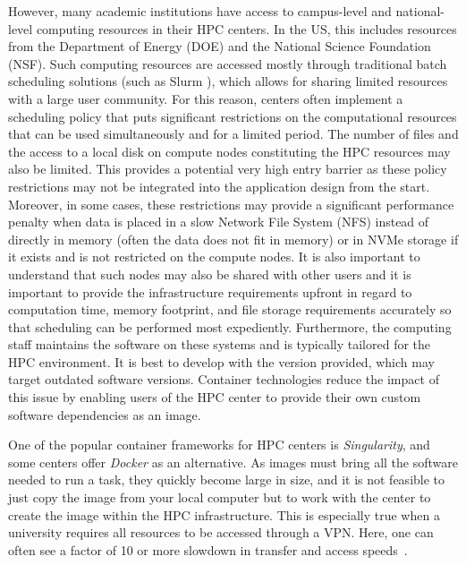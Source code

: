 \documentclass[utf8]{FrontiersinVancouver} %
\begin{document}
However, many academic institutions have access to campus-level and national-level computing resources in their HPC centers. In the US, this includes resources from the Department of Energy (DOE) and the National Science Foundation (NSF). Such computing resources are accessed mostly through traditional batch scheduling solutions (such as Slurm \citep{www-slurm}), which allows for sharing limited resources with a large user community. For this reason, centers often implement a scheduling policy that puts significant restrictions on the computational resources that can be used simultaneously and for a limited period. The number of files and the access to a local disk on compute nodes constituting the HPC resources may also be limited. This provides a potential very high entry barrier as these policy restrictions may not be integrated into the application design from the start. Moreover, in some cases, these restrictions may provide a significant performance penalty when data is placed in a slow Network File System (NFS) instead of directly in memory (often the data does not fit in memory) or in NVMe storage if it exists and is not restricted on the compute nodes.  It is also important to understand that such nodes may also be shared with other users and it is important to provide the infrastructure requirements upfront in regard to computation time, memory footprint, and file storage requirements accurately so that scheduling can be performed most expediently.  Furthermore, the computing staff maintains the software on these systems and is typically tailored for the HPC environment.  It is best to develop with the version provided, which may target outdated software versions.  Container technologies reduce the impact of this issue by enabling users of the HPC center to provide their own custom software dependencies as an image.

One of the popular container frameworks for HPC centers is {\em Singularity}, and some centers offer {\em Docker} as an alternative. As images must bring all the software needed to run a task, they quickly become large in size, and it is not feasible to just copy the image from your local computer but to work with the center to create the image within the HPC infrastructure. This is especially true when a university requires all resources to be accessed through a VPN. Here, one can often see a factor of 10 or more slowdown in transfer and access speeds~\cite{tovar}.
\end{document}
